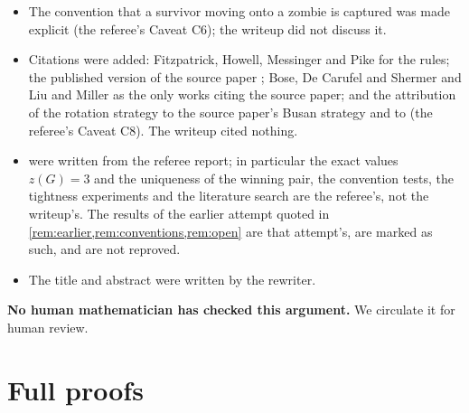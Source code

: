\documentclass[11pt,a4paper]{article}
\theoremstyle{plain}
\theoremstyle{definition}
\theoremstyle{remark}
\begin{document}
\begin{itemize}
\item The convention that a survivor moving onto a zombie is captured was made explicit (the referee's Caveat C6); the writeup did not discuss it.
\item Citations were added: Fitzpatrick, Howell, Messinger and Pike \cite{FHMP16} for the rules; the published version of the source paper \cite{BBBLN21}; Bose, De Carufel and Shermer \cite{BDS22} and Liu and Miller \cite{LM26} as the only works citing the source paper; and the attribution of the rotation strategy to the source paper's Busan strategy and to \cite[Lemma~1]{LM26} (the referee's Caveat C8). The writeup cited nothing.
\item {} were written from the referee report; in particular the exact values $z(G)=3$ and the uniqueness of the winning pair, the convention tests, the tightness experiments and the literature search are the referee's, not the writeup's. The results of the earlier attempt quoted in \cref{rem:earlier,rem:conventions,rem:open} are that attempt's, are marked as such, and are not reproved.
\item The title and abstract were written by the rewriter.
\end{itemize}
\textbf{No human mathematician has checked this argument.} We circulate it for human review.

\appendix

\section{Full proofs}\label{app:proofs}
\end{document}
